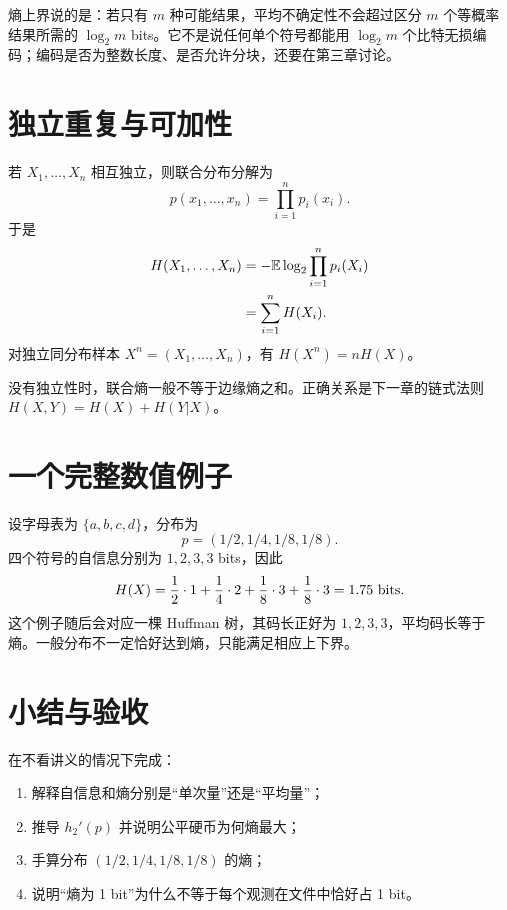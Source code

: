 \begin{intuitionbox}
熵上界说的是：若只有 $m$ 种可能结果，平均不确定性不会超过区分 $m$ 个等概率结果所需的 $\log_2 m$ bits。它不是说任何单个符号都能用 $\log_2 m$ 个比特无损编码；编码是否为整数长度、是否允许分块，还要在第三章讨论。
\end{intuitionbox}

\section{独立重复与可加性}

若 $X_1,\dots,X_n$ 相互独立，则联合分布分解为
\[
p(x_1,\dots,x_n)=\prod_{i=1}^n p_i(x_i).
\]
于是
\begin{align*}
H(X_1,\dots,X_n)
&=-\mathbb{E}\log_2\prod_{i=1}^n p_i(X_i)\\
&=\sum_{i=1}^n H(X_i).
\end{align*}
对独立同分布样本 $X^n=(X_1,\dots,X_n)$，有 $H(X^n)=nH(X)$。

\begin{warningbox}
没有独立性时，联合熵一般不等于边缘熵之和。正确关系是下一章的链式法则
$H(X,Y)=H(X)+H(Y|X)$。
\end{warningbox}

\section{一个完整数值例子}

设字母表为 $\{a,b,c,d\}$，分布为
\[
p=(1/2,1/4,1/8,1/8).
\]
四个符号的自信息分别为 $1,2,3,3$ bits，因此
\[
H(X)=\frac12\cdot1+\frac14\cdot2+\frac18\cdot3+\frac18\cdot3
=1.75\text{ bits}.
\]
这个例子随后会对应一棵 Huffman 树，其码长正好为 $1,2,3,3$，平均码长等于熵。一般分布不一定恰好达到熵，只能满足相应上下界。

\section{小结与验收}

\begin{checkpointbox}
在不看讲义的情况下完成：
\begin{enumerate}
  \item 解释自信息和熵分别是“单次量”还是“平均量”；
  \item 推导 $h_2'(p)$ 并说明公平硬币为何熵最大；
  \item 手算分布 $(1/2,1/4,1/8,1/8)$ 的熵；
  \item 说明“熵为 1 bit”为什么不等于每个观测在文件中恰好占 1 bit。
\end{enumerate}
\end{checkpointbox}
